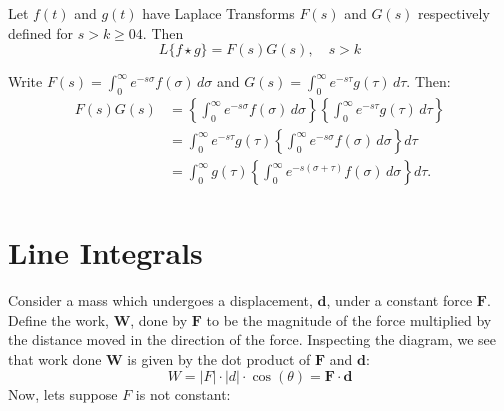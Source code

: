 \documentclass[a4paper, 10pt]{article}
\begin{document}
\begin{theorembox}
  Let $f(t)$ and $g(t)$ have Laplace Transforms $F(s)$ and $G(s)$ respectively defined for $s > k \geq 04$. Then
  $$L\{f \star g\} = F(s)G(s), \quad s > k$$
\end{theorembox}

\begin{proofbox}
  Write \( F(s) = \int_{0}^{\infty} e^{-s\sigma} f(\sigma) \, d\sigma \) and \( G(s) = \int_{0}^{\infty} e^{-s\tau} g(\tau) \, d\tau \).
  Then:
  \begin{align*}
    F(s)G(s) & = \left\{ \int_{0}^{\infty} e^{-s\sigma} f(\sigma) \, d\sigma \right\} \left\{ \int_{0}^{\infty} e^{-s\tau} g(\tau) \, d\tau \right\} \\
             & = \int_{0}^{\infty} e^{-s\tau} g(\tau) \left\{ \int_{0}^{\infty} e^{-s\sigma} f(\sigma) \, d\sigma \right\} d\tau                     \\
             & = \int_{0}^{\infty} g(\tau) \left\{ \int_{0}^{\infty} e^{-s(\sigma+\tau)} f(\sigma) \, d\sigma \right\} d\tau.                        \\
  \end{align*}
\end{proofbox}

\pagebreak

\section{Line Integrals}
\begin{minipage}{0.69\textwidth}
  Consider a mass which undergoes a displacement, $\boldsymbol{d}$, under a constant force $\boldsymbol{F}$. Define the work, $\boldsymbol{W}$, done by $\boldsymbol{F}$ to be the magnitude of the force multiplied by the distance moved in the direction of the force.
  Inspecting the diagram, we see that work done $\boldsymbol{W}$ is given by the dot product of $\boldsymbol{F}$ and $\boldsymbol{d}$:
  $$W = |F| \cdot |d| \cdot \cos(\theta) = \boldsymbol{F} \cdot \boldsymbol{d}$$
  Now, lets suppose $F$ is not constant:
\end{minipage}
\begin{minipage}{0.3\textwidth}
  \begin{center}
  \end{center}

\end{minipage}
\end{document}
